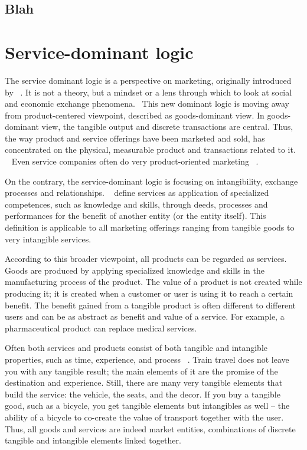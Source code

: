 \documentclass[12pt,a4paper,oneside,pdftex]{report}
\begin{document}
\subsection{Blah}



\section{Service-dominant logic}
The service dominant logic is a perspective on marketing, originally introduced by ~\citet{vargolusch2004}. It is not a theory, but a mindset or a lens through which to look at social and economic exchange phenomena.~\citep{vargolusch2008a} This new dominant logic is moving away from product-centered viewpoint, described as goods-dominant view. In goods-dominant view, the tangible output and discrete transactions are central. Thus, the way product and service offerings have been marketed and sold, has concentrated on the physical, measurable product and transactions related to it. ~\citep{vargolusch2004} Even service companies often do very product-oriented marketing ~\citep{shostack1977}.

On the contrary, the service-dominant logic is focusing on intangibility, exchange processes and relationships. ~\citet{vargolusch2004} define services as application of specialized competences, such as knowledge and skills, through deeds, processes and performances for the benefit of another entity (or the entity itself). This definition is applicable to all marketing offerings ranging from tangible goods to very intangible services. 

According to this broader viewpoint, all products can be regarded as services. Goods are produced by applying specialized knowledge and skills in the manufacturing process of the product. The value of a product is not created while producing it; it is created when a customer or user is using it to reach a certain benefit. The benefit gained from a tangible product is often different to different users and can be as abstract as benefit and value of a service. For example, a pharmaceutical product can replace medical services. ~\citep{vargolusch2004} 

Often both services and products consist of both tangible and intangible properties, such as time, experience, and process ~\citep{shostack1977}. Train travel does not leave you with any tangible result; the main elements of it are the promise of the destination and experience. Still, there are many very tangible elements that build the service: the vehicle, the seats, and the decor. If you buy a tangible good, such as a bicycle, you get tangible elements but intangibles as well – the ability of a bicycle to co-create the value of transport together with the user. Thus, all goods and services are indeed market entities, combinations of discrete tangible and intangible elements linked together. 
\end{document}
